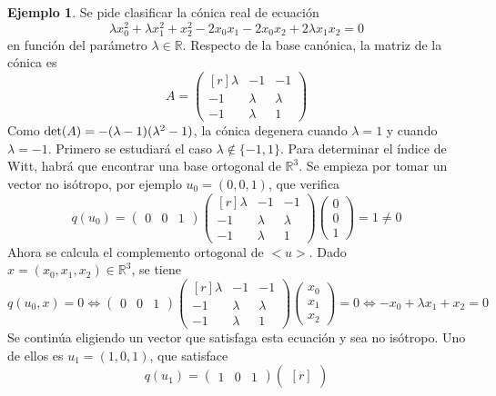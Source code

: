 \documentclass[12pt]{report}
\theoremstyle{definition}
\theoremstyle{definition}
\newtheorem{example}{Ejemplo}[chapter]
\theoremstyle{remark}
\newcommand{\R}{\mathbb R}
\begin{document}
\begin{example}
Se pide clasificar la cónica real de ecuación
\[\lambda x_0^2 +\lambda x_1^2 + x_2^2 - 2x_0x_1-2x_0x_2+2\lambda x_1 x_2 = 0\]
en función del parámetro $\lambda \in \R$. Respecto de la base canónica, la matriz de la cónica es
\[A = \begin{pmatrix*}[r]
    \lambda & -1 & -1 \\
    -1 & \lambda & \lambda \\
    -1 & \lambda & 1
\end{pmatrix*}\]
Como $\textup{det}(A) = -(\lambda - 1)(\lambda^2-1)$, la cónica degenera cuando $\lambda = 1$ y cuando $\lambda = -1$. Primero se estudiará el caso $\lambda \notin \{-1,1\}$. Para determinar el índice de Witt, habrá que encontrar una base ortogonal de $\R^3$. Se empieza por tomar un vector no isótropo, por ejemplo $u_0 = (0,0,1)$, que verifica
\[q(u_0) = \begin{pmatrix}
    0 & 0 & 1
\end{pmatrix} \begin{pmatrix*}[r]
    \lambda & -1 & -1 \\
    -1 & \lambda & \lambda \\
    -1 & \lambda & 1
\end{pmatrix*} \begin{pmatrix}
    0 \\
    0 \\
    1
\end{pmatrix} = 1 \neq 0
\]
Ahora se calcula el complemento ortogonal de $<u>$. Dado $x = (x_0,x_1,x_2) \in \R^3$, se tiene
\[q(u_0,x) = 0 \iff \begin{pmatrix}
    0 & 0 & 1
\end{pmatrix} \begin{pmatrix*}[r]
    \lambda & -1 & -1 \\
    -1 & \lambda & \lambda \\
    -1 & \lambda & 1
\end{pmatrix*} \begin{pmatrix}
    x_0 \\
    x_1 \\
    x_2
\end{pmatrix} = 0 \iff -x_0+\lambda x_1+x_2 = 0\]
Se continúa eligiendo un vector que satisfaga esta ecuación y sea no isótropo. Uno de ellos es $u_1=(1,0,1)$, que satisface
\[q(u_1) = \begin{pmatrix}
    1 & 0 & 1
\end{pmatrix} \begin{pmatrix*}[r]

\end{pmatrix*}\]
\end{example}
\end{document}
